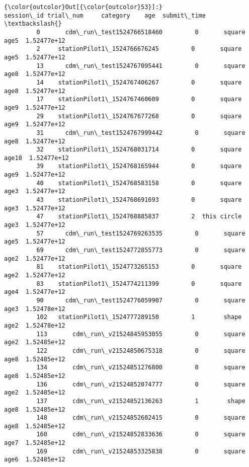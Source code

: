 \documentclass[11pt]{article}
\begin{document}
\begin{Verbatim}[commandchars=\\\{\}]
{\color{outcolor}Out[{\color{outcolor}53}]:}                        session\_id trial\_num     category    age  submit\_time  \textbackslash{}
         0       cdm\_run\_test1524766518460         0       square   age5  1.52477e+12   
         2     stationPilot1\_1524766676245         0       square   age5  1.52477e+12   
         13      cdm\_run\_test1524767095441         0       square   age8  1.52477e+12   
         14    stationPilot1\_1524767406267         0       square   age8  1.52477e+12   
         17    stationPilot1\_1524767460609         0       square   age9  1.52477e+12   
         29    stationPilot1\_1524767677268         0       square   age9  1.52477e+12   
         31      cdm\_run\_test1524767999442         0       square   age8  1.52477e+12   
         32    stationPilot1\_1524768031714         0       square  age10  1.52477e+12   
         39    stationPilot1\_1524768165944         0       square   age9  1.52477e+12   
         40    stationPilot1\_1524768583158         0       square   age3  1.52477e+12   
         43    stationPilot1\_1524768691693         0       square   age3  1.52477e+12   
         47    stationPilot1\_1524768885837         2  this circle   age3  1.52477e+12   
         57      cdm\_run\_test1524769263535         0       square   age5  1.52477e+12   
         69      cdm\_run\_test1524772855773         0       square   age2  1.52477e+12   
         81    stationPilot1\_1524773265153         0       square   age2  1.52477e+12   
         83    stationPilot1\_1524774211399         0       square   age4  1.52477e+12   
         90      cdm\_run\_test1524776059907         0       square   age3  1.52478e+12   
         102   stationPilot1\_1524777289150         1        shape   age2  1.52478e+12   
         113       cdm\_run\_v21524845953055         0       square   age2  1.52485e+12   
         122       cdm\_run\_v21524850675318         0       square   age8  1.52485e+12   
         134       cdm\_run\_v21524851276800         0       square   age8  1.52485e+12   
         136       cdm\_run\_v21524852074777         0       square   age2  1.52485e+12   
         137       cdm\_run\_v21524852136263         1        shape   age8  1.52485e+12   
         148       cdm\_run\_v21524852602415         0       square   age8  1.52485e+12   
         160       cdm\_run\_v21524852833636         0       square   age7  1.52485e+12   
         169       cdm\_run\_v21524853325838         0       square   age6  1.52485e+12   

\end{Verbatim}
\end{document}
